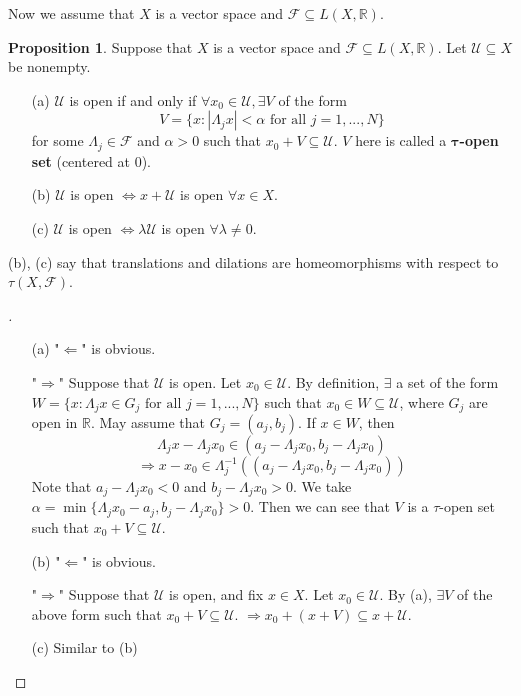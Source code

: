 \documentclass{article}
\theoremstyle{definition}
\newtheorem{prop}{Proposition}
\newenvironment{proofs}[1][\proofname]{%
  \begin{proof}[#1]$ $\par\nobreak\ignorespaces
}{%
  \end{proof}
}
\newcommand{\F}{\mathcal F}
\newcommand{\RR}{\mathbb R}
\newcommand{\U}{\mathcal U}
\newcommand{\Ra}{\Rightarrow}
\newcommand{\La}{\Leftarrow}
\newcommand{\Lra}{\Leftrightarrow}
\begin{document}
Now we assume that $X$ is a vector space and $\F \subseteq L(X, \RR)$.

\begin{prop}
	Suppose that $X$ is a vector space and $\F \subseteq L(X, \RR)$.
	Let $\U \subseteq X$ be nonempty.
	\begin{enumerate}
		\item[(a)] $\U$ is open if and only if $\forall x_0 \in \U, \exists V$ of the form 
			\[
				V = \{x: |\Lambda_j x| < \alpha \text{ for all } j = 1, ..., N\}
			\]
			for some $\Lambda_j \in \F$ and $\alpha > 0$ such that $x_0 + V \subseteq \U$.
			$V$ here is called a $\bm{\tau}$\textbf{-open set} (centered at 0).

		\item[(b)] $\U$ is open $\Lra x + \U$ is open $\forall x \in X$.

		\item[(c)] $\U$ is open $\Lra \lambda \U$ is open $\forall \lambda \neq 0$.
	\end{enumerate}
	(b), (c) say that translations and dilations are homeomorphisms with respect to $\tau(X, \F)$.
\end{prop}

\begin{proofs}
	\begin{enumerate}
		\item[(a)] "$\La$" is obvious.
			\par "$\Ra$" Suppose that $\U$ is open.
			Let $x_0 \in \U$.
			By definition, $\exists$ a set of the form $W = \{x: \Lambda_j x \in G_j \text{ for all } j = 1, ..., N\}$ such that $x_0 \in W \subseteq \U$, where $G_j$ are open in $\RR$. 
			May assume that $G_j = (a_j, b_j)$.
			If $x \in W$, then 
			\[
				\Lambda_j x - \Lambda_j x_0 \in (a_j - \Lambda_j x_0, b_j - \Lambda_j x_0)
			\]
			\[
				\Ra x - x_0 \in \Lambda_j^{-1}((a_j - \Lambda_j x_0, b_j - \Lambda_j x_0))
			\]
			Note that $a_j - \Lambda_j x_0 < 0$ and $b_j - \Lambda_j x_0 > 0$.
			We take $\alpha = \min\{ \Lambda_j x_0 - a_j, b_j - \Lambda_j x_0 \} > 0$.
			Then we can see that $V$ is a $\tau$-open set such that $x_0 + V \subseteq \U$.

		\item[(b)] "$\La$" is obvious.
			\par "$\Ra$" Suppose that $\U$ is open, and fix $x \in X$.
			Let $x_0 \in \U$.
			By (a), $\exists V$ of the above form such that $x_0 + V \subseteq \U$.
			$\Ra x_0 + (x + V) \subseteq x + \U$.

		\item[(c)] Similar to (b)
	\end{enumerate}
\end{proofs}
\end{document}
